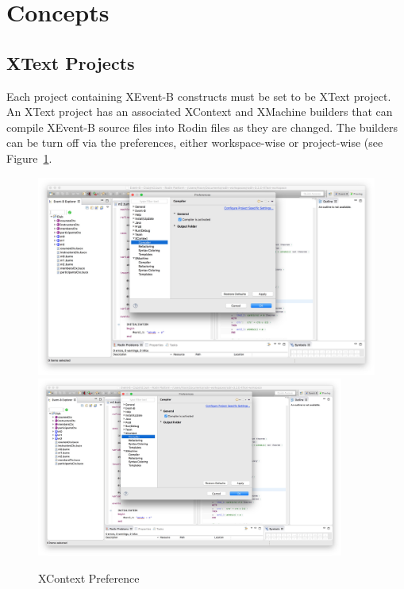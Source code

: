\section{Concepts}
\label{sec:concepts}

\subsection{XText Projects}
\label{sec:xtext-projects}

Each project containing XEvent-B constructs must be set to be XText project.  An XText project has an associated XContext and XMachine builders that can compile XEvent-B source files into Rodin files as they are changed.  The builders can be turn off via the preferences, either workspace-wise or project-wise (see Figure~\ref{fig:XContextPreference}.
\begin{figure}[!htbp]
  \centering
  \ifplastex
  \includegraphics[width=512]{figures/XContextPreference}
  \else
  \includegraphics[width=0.9\textwidth]{figures/XContextPreference}
  \fi
  \caption{XContext Preference}
  \label{fig:XContextPreference}
\end{figure}


